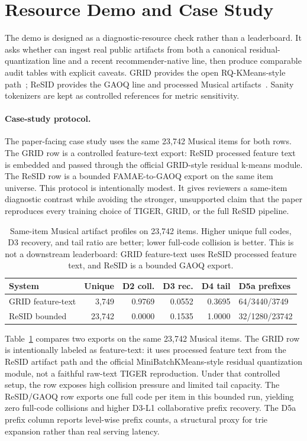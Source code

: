 \section{Resource Demo and Case Study}

The demo is designed as a diagnostic-resource check rather than a leaderboard.
It asks whether \tool can ingest real public \sid artifacts from both a
canonical residual-quantization line and a recent recommender-native line, then
produce comparable audit tables with explicit caveats. GRID provides the
open RQ-KMeans-style path~\cite{ju2025grid}; ReSID provides the GAOQ line and
processed Musical artifacts~\cite{liang2026resid}. Sanity tokenizers are kept
as controlled references for metric sensitivity.

\paragraph{Case-study protocol.}
The paper-facing case study uses the same 23,742 Musical items for both rows.
The GRID row is a controlled feature-text export: ReSID processed feature text
is embedded and passed through the official GRID-style residual k-means module.
The ReSID row is a bounded FAMAE-to-GAOQ export on the same item universe. This
protocol is intentionally modest. It gives reviewers a same-item diagnostic
contrast while avoiding the stronger, unsupported claim that the paper
reproduces every training choice of TIGER, GRID, or the full ReSID pipeline.

\begin{table}[t]
\caption{Same-item Musical artifact profiles on 23,742 items. Higher unique
full codes, D3 recovery, and tail ratio are better; lower full-code collision
is better. This is not a downstream leaderboard: GRID feature-text uses ReSID
processed feature text, and ReSID is a bounded GAOQ export.}
\label{tab:musical-diagnostic}
\small
\setlength{\tabcolsep}{2.0pt}
\begin{tabular}{@{}lrrrrl@{}}
\toprule
System & Unique & D2 coll. & D3 rec. & D4 tail & D5a prefixes \\
\midrule
GRID feature-text & 3,749 & 0.9769 & 0.0552 & 0.3695 & 64/3440/3749 \\
ReSID bounded & 23,742 & 0.0000 & 0.1535 & 1.0000 & 32/1280/23742 \\
\bottomrule
\end{tabular}
\end{table}

Table~\ref{tab:musical-diagnostic} compares two exports on the same 23,742
Musical items. The GRID row is intentionally labeled as feature-text: it uses
processed feature text from the ReSID artifact path and the official
MiniBatchKMeans-style residual quantization module, not a faithful raw-text
TIGER reproduction. Under that controlled setup, the row exposes high collision
pressure and limited tail capacity. The ReSID/GAOQ row exports one full code
per item in this bounded run, yielding zero full-code collisions and higher
D3-L1 collaborative prefix recovery. The D5a prefix column reports level-wise
prefix counts, a structural proxy for trie expansion rather than real serving
latency.

